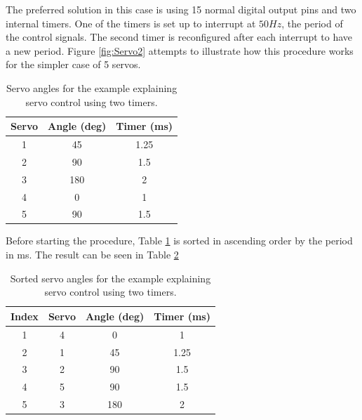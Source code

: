 The preferred solution in this case is using 15 normal digital output pins and two internal timers. One of the timers is set up to interrupt at $50Hz$, the period of the control signals. The second timer is reconfigured after each interrupt to have a new period. Figure \ref{fig:Servo2} attempts to illustrate how this procedure works for the simpler case of 5 servos.\\

\begin{table}[H]
\centering

\begin{tabular}{ccc}
\textbf{Servo} & \multicolumn{1}{l}{\textbf{Angle (deg)}} & \multicolumn{1}{l}{\textbf{Timer (ms)}} \\ \hline
1              & 45                                       & 1.25                                \\
2              & 90                                      & 1.5                                    \\
3              & 180                                      & 2                                       \\
4              & 0                                        & 1                                       \\
5              & 90                                      & 1.5                                    
\end{tabular}
\caption{Servo angles for the example explaining servo control using two timers.}
\label{tab:servo}
\end{table}

Before starting the procedure, Table \ref{tab:servo} is sorted in ascending order by the period in ms. The result can be seen in Table \ref{tab:servo2}

\begin{table}[H]
\centering

\begin{tabular}{cccc}
\textbf{Index} & \textbf{Servo} & \textbf{Angle (deg)} & \textbf{Timer (ms)} \\ \hline
1              & 4              & 0                    & 1                   \\
2              & 1              & 45                   & 1.25                \\
3              & 2              & 90                   & 1.5                 \\
4              & 5              & 90                   & 1.5                 \\
5              & 3              & 180                  & 2                  
\end{tabular}
\caption{Sorted servo angles for the example explaining servo control using two timers.}
\label{tab:servo2}
\end{table}

